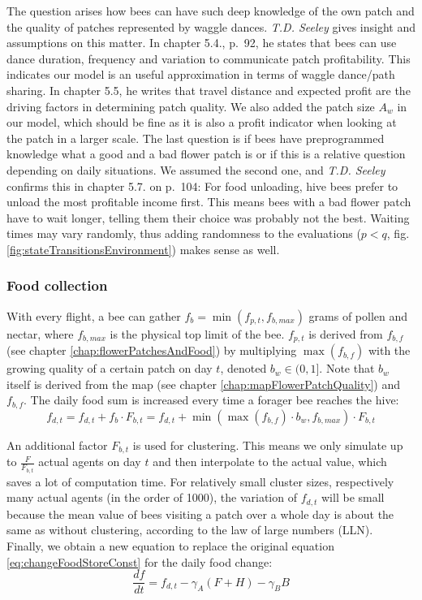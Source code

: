 			The question arises how bees can have such deep knowledge of the own patch and the quality of patches represented by waggle dances. \textit{T.D. Seeley} \cite{seeley95} gives insight and assumptions on this matter. In chapter 5.4., p.~92, he states that bees can use dance duration, frequency and variation to communicate patch profitability. This indicates our model is an useful approximation in terms of waggle dance/path sharing. In chapter 5.5, he writes that travel distance and expected profit are the driving factors in determining patch quality. We also added the patch size $A_w$ in our model, which should be fine as it is also a profit indicator when looking at the patch in a larger scale. The last question is if bees have preprogrammed knowledge what a good and a bad flower patch is or if this is a relative question depending on daily situations. We assumed the second one, and \textit{T.D. Seeley} confirms this in chapter 5.7. on p.~104: For food unloading, hive bees prefer to unload the most profitable income first. This means bees with a bad flower patch have to wait longer, telling them their choice was probably not the best. Waiting times may vary randomly, thus adding randomness to the evaluations ($p < q$, fig. \ref{fig:stateTransitionsEnvironment}) makes sense as well.
	
		\subsubsection{Food collection}
			\label{chap:foodCollection}
			With every flight, a bee can gather $f_b = \min(f_{p,t},f_{b,max})$ grams of pollen and nectar, where $f_{b,max}$ is the physical top limit of the bee. $f_{p,t}$ is derived from $f_{b,f}$ (see chapter \ref{chap:flowerPatchesAndFood}) by multiplying $\max(f_{b,f})$ with the growing quality of a certain patch on day $t$, denoted $b_w \in (0,1]$. Note that $b_w$ itself is derived from the map (see chapter \ref{chap:mapFlowerPatchQuality}) and $f_{b,f}$. The daily food sum is increased every time a forager bee reaches the hive:			
			\begin{equation}\label{eq:foodChangeDailyComputation}
				f_{d,t} = f_{d,t} + f_b \cdot F_{b,t} = f_{d,t} + \min(\max(f_{b,f}) \cdot b_w,f_{b,max}) \cdot F_{b,t}
			\end{equation}
			
			An additional factor $F_{b,t}$ is used for clustering. This means we only simulate up to $\frac{F}{F_{b,t}}$ actual agents on day $t$ and then interpolate to the actual value, which saves a lot of computation time. For relatively small cluster sizes, respectively many actual agents (in the order of 1000), the variation of $f_{d,t}$ will be small because the mean value of bees visiting a patch over a whole day is about the same as without clustering, according to the law of large numbers (LLN).\\
			Finally, we obtain a new equation to replace the original equation \ref{eq:changeFoodStoreConst} for the daily food change:	\begin{equation}\label{eq:changeFoodStoreDyn}
				\frac{df}{dt} = f_{d,t} - \gamma_A (F+H) - \gamma_B B
			\end{equation}
			
